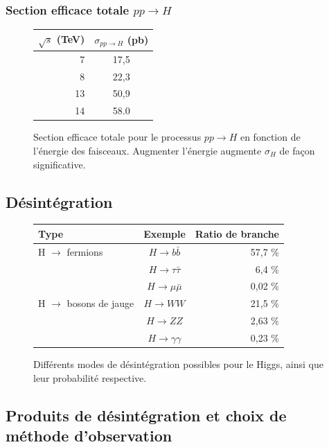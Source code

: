 \documentclass[11pt]{article} %
\begin{document}
\subsubsection{Section efficace totale $pp \to H$}

\begin{figure}[H]
      \centering
\begin{tabular}{|r|c|} 
   \hline
   $\sqrt{s}$ (TeV) & $\sigma_{pp \to H}$ (pb) \\
    \hline
   7 &  17,5\\
\hline
   8 & 22,3 \\
\hline
   13 & 50,9  \\
\hline
   14 & 58.0 \\
  \hline
\end{tabular}
\caption{Section efficace totale pour le processus $pp \to H$ en fonction de l'énergie des faisceaux. Augmenter l'énergie augmente $\sigma_H$ de façon significative.}
\end{figure}

\subsection{Désintégration}

\begin{figure}[H]
\centering
\begin{tabular}{|l|c|r|} 
   \hline
   Type & Exemple & Ratio de branche\\
    \hline
    H $\to$ fermions & $H \to b\bar{b} $ & 57,7 \% \\
    \cline{2-3} 
        & $H \to \tau\bar{\tau} $ & 6,4 \% \\
   \cline{2-3} 
        & $H \to \mu\bar{\mu}$ & 0,02 \%\\
    \hline
  H $\to$ bosons de jauge & $H \to WW$ &21,5 \% \\
   \cline{2-3}
     & $H \to ZZ$ & 2,63 \% \\
   \cline{2-3}
      & $H \to \gamma \gamma$ & 0,23 \% \\
  \hline
\end{tabular}
\caption{Différents modes de désintégration possibles pour le Higgs, ainsi que leur probabilité respective. }
\end{figure}

\subsection{Produits de désintégration et choix de méthode d'observation}
\end{document}
